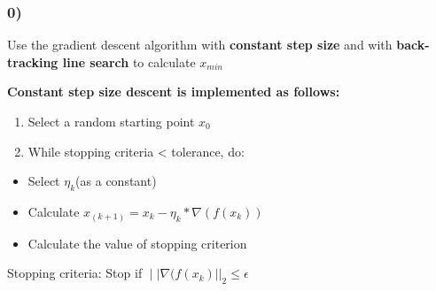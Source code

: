 \documentclass[
  letterpaper,
  DIV=11,
  numbers=noendperiod]{scrartcl}
\providecommand{\tightlist}{%
  \setlength{\itemsep}{0pt}\setlength{\parskip}{0pt}}\usepackage{longtable,booktabs,array}
\begin{document}
\subsubsection{0)}\label{section}

Use the gradient descent algorithm with \textbf{constant step size} and
with \textbf{back-tracking line search} to calculate \(x_{min}\)

\textbf{Constant step size descent is implemented as follows:}

\begin{enumerate}
\def\labelenumi{\arabic{enumi}.}
\tightlist
\item
  Select a random starting point \(x_0\)\\
\item
  While stopping criteria \textless{} tolerance, do:
\end{enumerate}

\begin{itemize}
\tightlist
\item
  Select \(η_k\)(as a constant)\\
\item
  Calculate \(x_{(k+1)} = x_k - η_k * ∇(f(x_k))\)\\
\item
  Calculate the value of stopping criterion
\end{itemize}

Stopping criteria: Stop if \(∣|∇(f(x_k)||_2 ≤ ϵ\)
\end{document}
